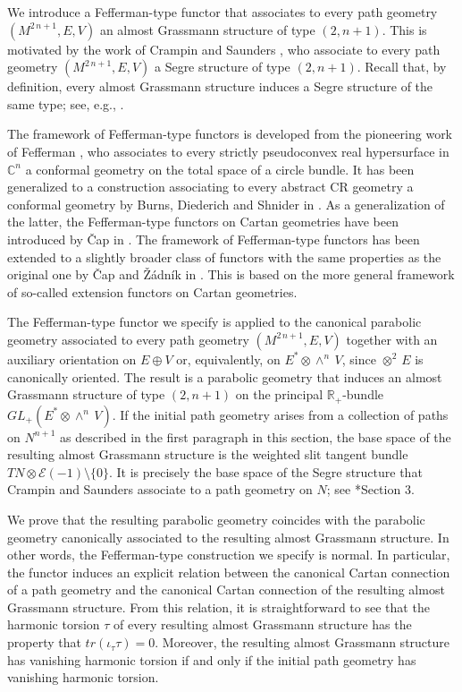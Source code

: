 \documentclass[11pt]{amsart}
\begin{document}
We introduce a Fefferman-type functor that associates to every path geometry $(M^{2\,n+1},E,V)$ an almost Grassmann structure of type $(2,n+1)$. This is motivated by the work of Crampin and Saunders \cite{CrSa}, who associate to every path geometry $(M^{2\,n+1},E,V)$ a Segre structure of type $(2,n+1)$. Recall that, by definition, every almost Grassmann structure induces a Segre structure of the same type; see, e.g., \cite{Met13}.

The framework of Fefferman-type functors is developed from the pioneering work of Fefferman \cite{Fef76}, who associates to every strictly pseudoconvex real hypersurface in $\mathbb C^n$ a conformal geometry on the total space of a circle bundle. It has been generalized to a construction associating to every abstract CR geometry a conformal geometry by Burns, Diederich and Shnider in \cite{BDS}. As a generalization of the latter, the Fefferman-type functors on Cartan geometries have been introduced by \v Cap in \cite{Cap06}. The framework of Fefferman-type functors has been extended to a slightly broader class of functors with the same properties as the original one by \v Cap and \v Z\'adn\'ik in \cite{CZ09}. This is based on the more general framework of so-called extension functors on Cartan geometries.

The Fefferman-type functor we specify is applied to the canonical parabolic geometry associated to every path geometry $(M^{2\,n+1},E,V)$ together with an auxiliary orientation on $E\oplus V$ or, equivalently, on $E^*\otimes\wedge^n\,V$, since $\otimes^2\, E$ is canonically oriented. The result is a parabolic geometry that induces an almost Grassmann structure of type $(2,n+1)$ on the principal $\mathbb R_+$-bundle $GL_+(E^*\otimes\wedge^n\,V)$. If the initial path geometry arises from a collection of paths on $N^{n+1}$ as described in the first paragraph in this section, the base space of the resulting almost Grassmann structure is the weighted slit tangent bundle $TN\otimes\mathcal E(-1)\setminus\{0\}$. It is precisely the base space of the Segre structure that Crampin and Saunders associate to a path geometry on $N$; see \cite{CrSa}*{Section 3}.

We prove that the resulting parabolic geometry coincides with the parabolic geometry canonically associated to the resulting almost Grassmann structure. In other words, the Fefferman-type construction we specify is normal. In particular, the functor induces an explicit relation between the canonical Cartan connection of a path geometry and the canonical Cartan connection of the resulting almost Grassmann structure. From this relation, it is straightforward to see that the harmonic torsion $\tau$ of every resulting almost Grassmann structure has the property that $tr(\iota_\tau\tau)=0$. Moreover, the resulting almost Grassmann structure has vanishing harmonic torsion if and only if the initial path geometry has vanishing harmonic torsion.
\end{document}
